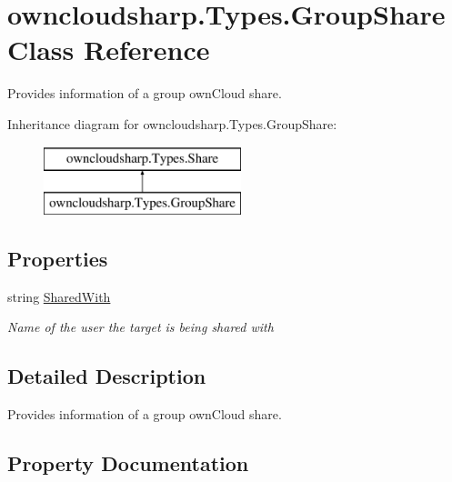 \hypertarget{classowncloudsharp_1_1_types_1_1_group_share}{}\section{owncloudsharp.\+Types.\+Group\+Share Class Reference}
\label{classowncloudsharp_1_1_types_1_1_group_share}


Provides information of a group own\+Cloud share.  


Inheritance diagram for owncloudsharp.\+Types.\+Group\+Share\+:\begin{figure}[H]
\begin{center}
\leavevmode
\includegraphics[height=2.000000cm]{classowncloudsharp_1_1_types_1_1_group_share}
\end{center}
\end{figure}
\subsection*{Properties}
\begin{DoxyCompactItemize}
\item 
string \hyperlink{classowncloudsharp_1_1_types_1_1_group_share_a6b51436f6f51780137ff9640b15d9e9c}{Shared\+With}
\begin{DoxyCompactList}\small\item\em Name of the user the target is being shared with \end{DoxyCompactList}\end{DoxyCompactItemize}


\subsection{Detailed Description}
Provides information of a group own\+Cloud share. 



\subsection{Property Documentation}
\mbox{\label{classowncloudsharp_1_1_types_1_1_group_share_a6b51436f6f51780137ff9640b15d9e9c}} 
